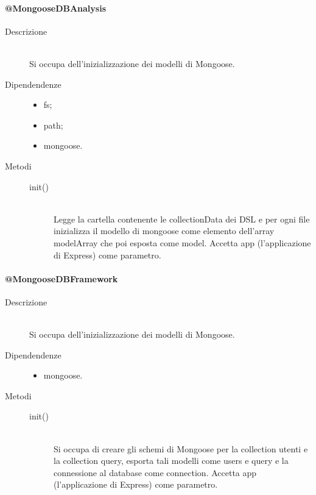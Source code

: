 \paragraph{@MongooseDBAnalysis}
\begin{description}
 \item[Descrizione] \hfill \\
 Si occupa dell'inizializzazione dei modelli di Mongoose.
 \item[Dipendendenze] \hfill
    \begin{itemize}
    \item fs;
    \item path;
    \item mongoose.
    \end{itemize}
\item[Metodi] \hfill
 \begin{description}
 \item[init()] \hfill \\
 Legge la cartella contenente le collectionData dei DSL e per ogni file inizializza il modello di mongoose come elemento dell'array modelArray che poi esposta come model. Accetta app (l'applicazione di Express) come parametro.
 \end{description}
\end{description}

\paragraph{@MongooseDBFramework}
\begin{description}
 \item[Descrizione] \hfill \\
 Si occupa dell'inizializzazione dei modelli di Mongoose.
  \item[Dipendendenze] \hfill
  \begin{itemize}
  \item mongoose.
  \end{itemize}
\item[Metodi] \hfill
 \begin{description}
 \item[init()] \hfill \\
 Si occupa di creare gli schemi di Mongoose per la collection utenti e la collection query, esporta tali modelli come users e query e la connessione al database come connection. Accetta app (l'applicazione di Express) come parametro.
 \end{description}
\end{description}

